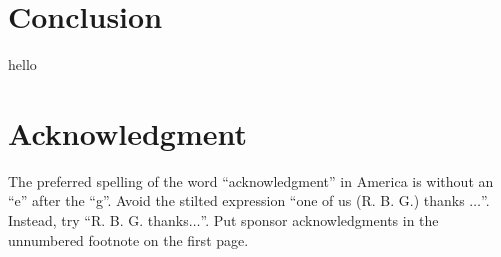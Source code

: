 \documentclass[conference]{IEEEtran}
\begin{document}
\section{Conclusion}

hello



\section*{Acknowledgment}

The preferred spelling of the word ``acknowledgment'' in America is without 
an ``e'' after the ``g''. Avoid the stilted expression ``one of us (R. B. 
G.) thanks $\ldots$''. Instead, try ``R. B. G. thanks$\ldots$''. Put sponsor 
acknowledgments in the unnumbered footnote on the first page.








\end{document}
